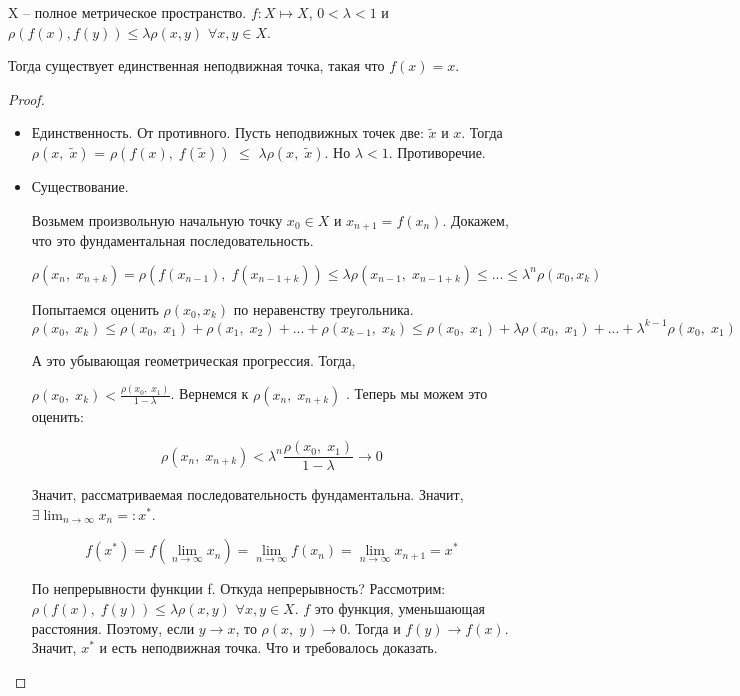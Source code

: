 
\begin{theorem} \thmslashn
	
	X – полное метрическое пространство. $f: X \mapsto X$,\; $0 < \lambda < 1$ и $\rho(f(x),f(y)) \le \lambda \rho(x, y)$ $\forall x, y \in X$. 
	
	Тогда существует единственная неподвижная точка, такая что $f(x) = x$.
	\begin{proof} \thmslashn
		
		\begin{itemize}
			\item Единственность.
			От противного. Пусть неподвижных точек две: $\widetilde{x}$ и $x$. Тогда $\rho(x,\;\widetilde{x})$ = $\rho(f(x),\;f(\widetilde{x}))$ $\le$
			$\lambda \rho(x,\;\widetilde{x})$. Но $\lambda < 1$. Противоречие.
			
			\item Существование.
			
			Возьмем произвольную начальную точку $x_0 \in X$ и $x_{n+1} = f(x_n)$. Докажем, что это фундаментальная последовательность.
			
			\[\rho(x_n,\;x_{n + k}) = \rho(f(x_{n-1}),\;f(x_{n - 1 + k})) \le \lambda \rho(x_{n-1},\; x_{n-1+k}) \le ... \le \lambda^n \rho(x_0, x_k)\]
			
			Попытаемся оценить $\rho(x_0, x_k)$ по неравенству треугольника.
			\[
			\rho(x_{0},\; x_{k}) \le \rho(x_{0},\; x_{1}) + \rho(x_{1},\; x_{2}) + ... + \rho(x_{k-1},\; x_{k}) \le \rho(x_{0},\; x_{1}) + \lambda \rho(x_{0},\; x_{1}) + ... + \lambda^{k-1}\rho(x_{0},\; x_{1})
			\]
			
			А это убывающая геометрическая прогрессия. Тогда, 
			
			$
			\rho(x_{0},\; x_{k}) < \frac{\rho(x_{0},\; x_{1})}{1 - \lambda}
			$. Вернемся к $\rho(x_n,\;x_{n + k})$ . Теперь мы можем это оценить:
			
			\[
			\rho(x_n,\;x_{n + k}) < \lambda^n \frac{\rho(x_{0},\; x_{1})}{1 - \lambda} \longrightarrow 0
			\]
			
			Значит, рассматриваемая последовательность фундаментальна. Значит, $\exists \lim_{n\to \infty} x_n =: x^*  $.
			
			\[
			f(x^*) = f(\lim_{n\to \infty} x_n) = \lim_{n\to \infty} f(x_n) = \lim_{n\to \infty} x_{n+1} = x^* 
			\] 
			
			По непрерывности функции f. Откуда непрерывность? Рассмотрим: $\rho(f(x),\;f(y)) \le \lambda \rho(x, y)$ $\forall x, y \in X$. $f$ это функция, уменьшающая расстояния. Поэтому, если $y \to x$, то $\rho (x,\; y) \to 0$. Тогда и $f(y) \to f(x)$. 
			Значит, $x^*$ и есть неподвижная точка. Что и требовалось доказать.
		\end{itemize}
	\end{proof}
	
\end{theorem}

